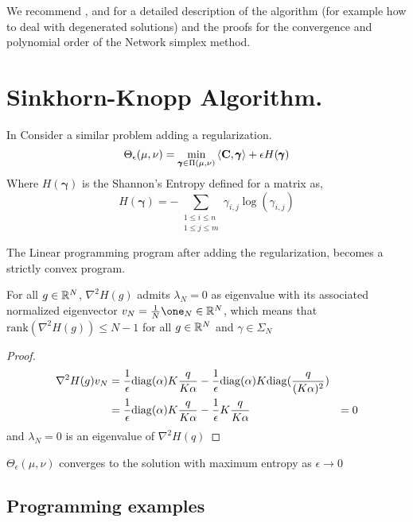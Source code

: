 We recommend \cite{Cuturi2018CompOT}, \cite{Orlin1997PolynomialTimeNetworkSimplex} and \cite{Tarjan1997DynamicTreesNetworkSimplex} for a detailed description of the algorithm (for example how to deal with degenerated solutions) and the proofs for the convergence and polynomial order of the Network simplex method.


\section{Sinkhorn-Knopp Algorithm.}
In Consider a similar problem adding a regularization.
\begin{equation}
	\Theta_\epsilon(\mu, \nu)=\min_{\pmb{\gamma}\in \Pi(\mu, \nu)}{\left\langle \mathbf{C},\pmb{\gamma} \right\rangle+\epsilon H(\pmb{\gamma})}
\end{equation}
Where $H(\pmb{\gamma})$ is the Shannon's Entropy defined for a matrix as,
\begin{equation}
	H(\pmb{\gamma})=-\sum_{\substack{1\leq i \leq n\\ 1\leq j \leq m}}\gamma_{i,j}\log(\gamma_{i,j})
\end{equation} 

\begin{theorem}
	The Linear programming program after adding the regularization, becomes a strictly convex program.
\end{theorem}
\begin{lemma}
	For all $g\in \mathbb{R}^N$, $\nabla^2 H(g)$ admits $\lambda_N=0$ as eigenvalue with its associated normalized eigenvector $v_N= \frac{1}{N}\one_N\in \Real^N$, which means that $\mathrm{rank}(\nabla^2 H(g))\leq N-1$ for all $g\in \mathbb{R}^N$ and $\gamma\in \Sigma_N$
\end{lemma}
\begin{proof}
\begin{align*}
	\nabla^2 H(g) v_N &=\frac{1}{\epsilon}\mathrm{diag}(\alpha)K\frac{q}{K\alpha}-\frac{1}{\epsilon}\mathrm{diag}(\alpha)K\mathrm{diag}(\frac{q}{(K\alpha)^2})\\
	&=\frac{1}{\epsilon}\mathrm{diag}(\alpha)K\frac{q}{K\alpha}-\frac{1}{\epsilon}K\frac{q}{K\alpha}
	&=0
\end{align*}
and $\lambda_N=0$ is an eigenvalue of $\nabla^2H(q)$
\end{proof}
\begin{theorem}
	$\Theta_\epsilon(\mu, \nu)$ converges to the solution with maximum entropy as $\epsilon\rightarrow 0$
\end{theorem}

\subsection{Programming examples}